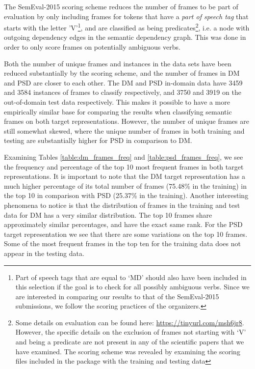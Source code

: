 The SemEval-2015 scoring scheme reduces the number of frames to be part of evaluation by only including frames for tokens that have a \textit{part of speech tag} that starts with the letter 'V'\footnote{Part of speech tags that are equal to `MD' should also have been included in this selection if the goal is to check for all possibly ambiguous verbs. Since we are interested in comparing our results to that of the SemEval-2015 submissions, we follow the scoring practices of the organizers.}, and are classified as being predicates\footnote{Some details on evaluation can be found here: \url{https://tinyurl.com/msh6jr8}. However, the specific details on the exclusion of frames not starting with `V' and being a predicate are not present in any of the scientific papers that we have examined. The scoring scheme was revealed by examining the scoring files included in the package with the training and testing data}, i.e. a node with outgoing dependency edges in the semantic dependency graph. This was done in order to only score frames on potentially ambiguous verbs.

Both the number of unique frames and instances in the data sets have been reduced substantially by the scoring scheme, and the number of frames in DM and PSD are closer to each other. The DM and PSD in-domain data have 3459 and 3584 instances of frames to classify respectively, and 3750 and 3919 on the out-of-domain test data respectively. This makes it possible to have a more empirically similar base for comparing the results when classifying semantic frames on both target representations. However, the number of unique frames are still somewhat skewed, where the unique number of frames in both training and testing are substantially higher for PSD in comparison to DM.

Examining Tables \ref{table:dm_frames_freq} and \ref{table:psd_frames_freq}, we see the frequency and percentage of the top 10 most frequent frames in both target representations. It is important to note that the DM target representation has a much higher percentage of its total number of frames (75.48\% in the training) in the top 10 in comparison with PSD (25.37\% in the training). Another interesting phenomena to notice is that the distribution of frames in the training and test data for DM has a very similar distribution. The top 10 frames share approximately similar percentages, and have the exact same rank. For the PSD target representation we see that there are some variations on the top 10 frames. Some of the most frequent frames in the top ten for the training data does not appear in the testing data.

